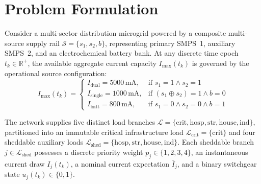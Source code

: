 \documentclass[journal,10pt,twocolumn]{IEEEtran}
\begin{document}
\section{Problem Formulation}
Consider a multi-sector distribution microgrid powered by a composite multi-source supply rail $\mathcal{S} = \{s_1, s_2, b\}$, representing primary SMPS~1, auxiliary SMPS~2, and an electrochemical battery bank. At any discrete time epoch $t_k \in \mathbb{R}^+$, the available aggregate current capacity $I_{\max}(t_k)$ is governed by the operational source configuration:
\begin{equation}
I_{\max}(t_k) = 
\begin{cases}
I_{\text{dual}} = 5000\,\text{mA}, & \text{if } s_1 = 1 \land s_2 = 1 \\
I_{\text{single}} = 1000\,\text{mA}, & \text{if } (s_1 \oplus s_2) = 1 \land b = 0 \\
I_{\text{batt}} = 800\,\text{mA}, & \text{if } s_1 = 0 \land s_2 = 0 \land b = 1
\end{cases}
\label{eq:source_capacity}
\end{equation}

The network supplies five distinct load branches $\mathcal{L} = \{\text{crit}, \text{hosp}, \text{str}, \text{house}, \text{ind}\}$, partitioned into an immutable critical infrastructure load $\mathcal{L}_{\text{crit}} = \{\text{crit}\}$ and four sheddable auxiliary loads $\mathcal{L}_{\text{shed}} = \{\text{hosp}, \text{str}, \text{house}, \text{ind}\}$. Each sheddable branch $j \in \mathcal{L}_{\text{shed}}$ possesses a discrete priority weight $p_j \in \{1, 2, 3, 4\}$, an instantaneous current draw $I_j(t_k)$, a nominal current expectation $\bar{I}_j$, and a binary switchgear state $u_j(t_k) \in \{0, 1\}$.
\end{document}
